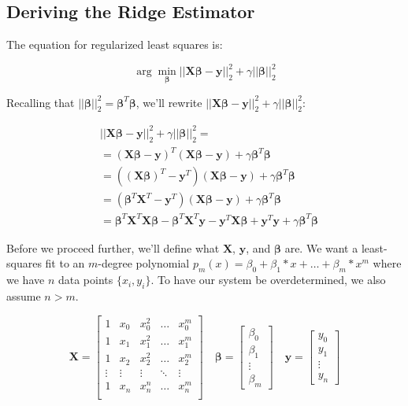 \documentclass{article}
\newcommand{\y}{\mathbf{y}}
\newcommand{\X}{\mathbf{X}}
\newcommand{\B}{\boldsymbol\beta} %
\begin{document}
\subsection{Deriving the Ridge Estimator}

The equation for regularized least squares is:

\begin{equation} \label{eqn:rls}
    \arg \min_{\B} ||\X\B-\y||_{2}^{2} + \gamma||\B||_{2}^{2}
\end{equation}

Recalling that $||\B||_{2}^{2}=\B^T \B$, we'll rewrite $||\X\B-\y||_{2}^{2} + \gamma||\B||_{2}^{2}$:

\begin{equation*}
\begin{split}
    & ||\X\B-\y||_{2}^{2} + \gamma||\B||_{2}^{2} =\\
    & =  (\X\B - \y)^T (\X\B - \y) + \gamma \B^T \B \\ 
    & =  ((\X\B)^T - \y^T) (\X\B - \y) + \gamma \B^T \B \\ 
    & =  (\B^T\X^T - \y^T) (\X\B - \y) + \gamma \B^T \B \\ 
    & = \B^T \X^T \X\B - \B^T \X^T \y - \y^T \X\B + \y^T \y + \gamma \B^T \B
\end{split}
\end{equation*}

Before we proceed further, we'll define what $\X$, $\y$, and $\B$ are. We want a least-squares fit to an $m$-degree polynomial $p_m(x)=\beta_0+\beta_1*x+\ldots+\beta_m*x^m$ where we have $n$ data points $\{x_i,y_i\}$. To have our system be overdetermined, we also assume $n > m$.

\begin{equation*}
    \X =
    \begin{bmatrix}
        1 & x_0 & x_0 ^2 & \ldots & x_0^m \\
        1 & x_1 & x_1 ^2 & \ldots & x_1^m \\
        1 & x_2 & x_2 ^2 & \ldots & x_2^m \\
        \vdots & \vdots & \vdots & \ddots & \vdots \\
        1 & x_n & x_n ^n & \ldots & x_n^m \\
    \end{bmatrix}
    \quad
    \B =
    \begin{bmatrix}
        \beta_0\\
        \beta_1\\
        \vdots\\
        \beta_m
    \end{bmatrix}
    \quad
    \y =
    \begin{bmatrix}
        y_0\\
        y_1\\
        \vdots\\
        y_n
    \end{bmatrix}
\end{equation*}
\end{document}

